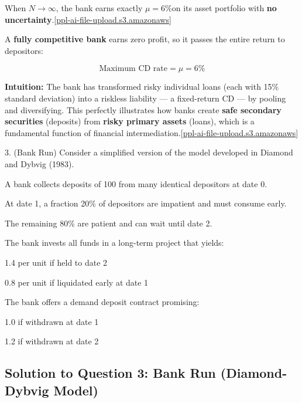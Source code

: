 \documentclass[a4paper]{article}
\begin{document}
When \(N \rightarrow \infty\), the bank earns exactly \(\mu = 6\%\)on
its asset portfolio with \textbf{no
uncertainty}.{[}\href{https://ppl-ai-file-upload.s3.amazonaws.com/web/direct-files/attachments/64012734/8ecdf432-f8fa-409d-b72d-017134eed977/Homework1.pdf}{ppl-ai-file-upload.s3.amazonaws}{]}\hspace{0pt}

A \textbf{fully competitive bank} earns zero profit, so it passes the
entire return to depositors:

\[\text{Maximum\ CD\ rate} = \mu = \boxed{6\%}\]

\textbf{Intuition:} The bank has transformed risky individual loans
(each with 15\% standard deviation) into a riskless liability --- a
fixed-return CD --- by pooling and diversifying. This perfectly
illustrates how banks create \textbf{safe secondary securities}
(deposits) from \textbf{risky primary assets} (loans), which is a
fundamental function of financial
intermediation.{[}\href{https://ppl-ai-file-upload.s3.amazonaws.com/web/direct-files/attachments/64012734/8ecdf432-f8fa-409d-b72d-017134eed977/Homework1.pdf}{ppl-ai-file-upload.s3.amazonaws}{]}\hspace{0pt}

3. (Bank Run) Consider a simplified version of the model developed in
Diamond and Dybvig (1983).

A bank collects deposits of 100 from many identical depositors at date
0.

At date 1, a fraction 20\% of depositors are impatient and must consume
early.

The remaining 80\% are patient and can wait until date 2.

The bank invests all funds in a long-term project that yields:

1.4 per unit if held to date 2

0.8 per unit if liquidated early at date 1

The bank offers a demand deposit contract promising:

1.0 if withdrawn at date 1

1.2 if withdrawn at date 2

\hypertarget{solution-to-question-3-bank-run-diamond-dybvig-model}{%
\subsection{Solution to Question 3: Bank Run (Diamond-Dybvig
Model)}\label{solution-to-question-3-bank-run-diamond-dybvig-model}}
\end{document}
